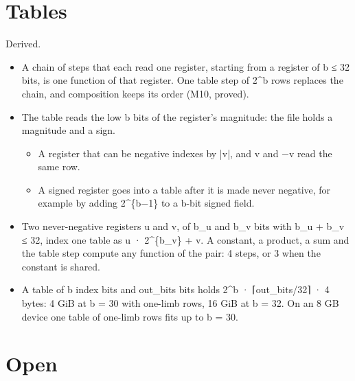 \section{\texorpdfstring{Tables}{Tables}}

Derived.

\begin{itemize}
\item A chain of steps that each read one register, starting from a register of b ≤ 32 bits, is one function of that register. One table step of 2\textasciicircum{}b rows replaces the chain, and composition keeps its order (M10, proved).
\item The table reads the low b bits of the register's magnitude: the file holds a magnitude and a sign.

\begin{itemize}
\item A register that can be negative indexes by |v|, and v and −v read the same row.
\item A signed register goes into a table after it is made never negative, for example by adding 2\textasciicircum{}\{b−1\} to a b-bit signed field.
\end{itemize}
\item Two never-negative registers u and v, of b\_\allowbreak{}u and b\_\allowbreak{}v bits with b\_\allowbreak{}u + b\_\allowbreak{}v ≤ 32, index one table as u · 2\textasciicircum{}\{b\_\allowbreak{}v\} + v. A constant, a product, a sum and the table step compute any function of the pair: 4 steps, or 3 when the constant is shared.
\item A table of b index bits and out\_\allowbreak{}bits bits holds 2\textasciicircum{}b · ⌈out\_\allowbreak{}bits/32⌉ · 4 bytes: 4 GiB at b = 30 with one-limb rows, 16 GiB at b = 32. On an 8 GB device one table of one-limb rows fits up to b = 30.
\end{itemize}

\section{\texorpdfstring{Open}{Open}}

